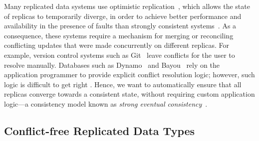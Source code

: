 \documentclass[10pt,journal,compsoc]{IEEEtran}
\begin{document}
Many replicated data systems use optimistic replication~\cite{Saito:2005jw}, which allows the state of replicas to temporarily diverge, in order to achieve better performance and availability in the presence of faults than strongly consistent systems~\cite{Bailis:2014th,Gilbert:2002il}.
As a consequence, these systems require a mechanism for merging or reconciling conflicting updates that were made concurrently on different replicas.
For example, version control systems such as Git~\cite{Chacon:2014kr} leave conflicts for the user to resolve manually.
Databases such as Dynamo~\cite{DeCandia:2007ui} and Bayou~\cite{Terry:1995dn} rely on the application programmer to provide explicit conflict resolution logic; however, such logic is difficult to get right \cite{Bailis:2013jc,Burckhardt:2014hy,Gomes:2017gy}.
Hence, we want to automatically ensure that all replicas converge towards a consistent state, without requiring custom application logic---a consistency model known as \emph{strong eventual consistency}~\cite{Shapiro:2011un,Gomes:2017gy}.

\subsection{Conflict-free Replicated Data Types}
\end{document}
